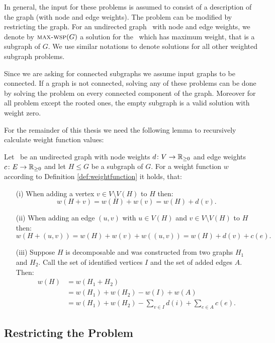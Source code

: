 In general, the input for these problems is assumed to consist of a description of the graph (with node and edge weights). The problem can be modified by restricting the graph. For an undirected graph \ugraph\ with node and edge weights, we denote by $\text{\textsc{max-wsp}}(G)$ a solution for the \WSP\ which has maximum weight, that is a subgraph of $G$. We use similar notations to denote solutions for all other weighted subgraph problems.\medskip

Since we are asking for connected subgraphs we assume input graphs to be connected. If a graph is not connected, solving any of these problems can be done by solving the problem on every connected component of the graph. Moreover for all problem except the rooted ones, the empty subgraph is a valid solution with weight zero.\medskip

For the remainder of this thesis we need the following lemma to recursively calculate weight function values:

\begin{lemma}
	\label{lemma:weightfunction}
	Let \ugraph\ be an undirected graph with node weights $d \colon V \to \mathbb{R}_{\geq 0}$ and edge weights $c \colon E \to \mathbb{R}_{\geq 0}$ and let $H \leq G$ be a subgraph of $G$. For a weight function $w$ according to Definition \ref{def:weightfunction} it holds, that:	
	\begin{itemize}
		\item[(i)] When adding a vertex $v \in V \setminus V(H)$ to $H$ then:
		$$ w(H+v) = w(H) + w(v) = w(H) + d(v).$$
		\item[(ii)] When adding an edge $(u,v)$ with $u \in V(H)$ and $v \in V \setminus V(H)$ to $H$ then:
		$$ w(H+(u,v)) = w(H) + w(v) + w((u, v)) = w(H) + d(v) + c(e).$$
		\item[(iii)] Suppose $H$ is decomposable and was constructed from two graphs $H_1$ and $H_2$. Call the set of identified vertices $I$ and the set of added edges $A$. Then:
		\begin{align*}
			w(H) &= w(H_1 + H_2)\\
			&= w(H_1) + w(H_2) - w(I) + w(A)\\
			&= w(H_1) + w(H_2) - \sum_{v \in I} d(i) + \sum_{e \in A} c(e).
		\end{align*}
	\end{itemize}
\end{lemma}

\subsection{Restricting the Problem}
\label{sec:wsp:restricted}

